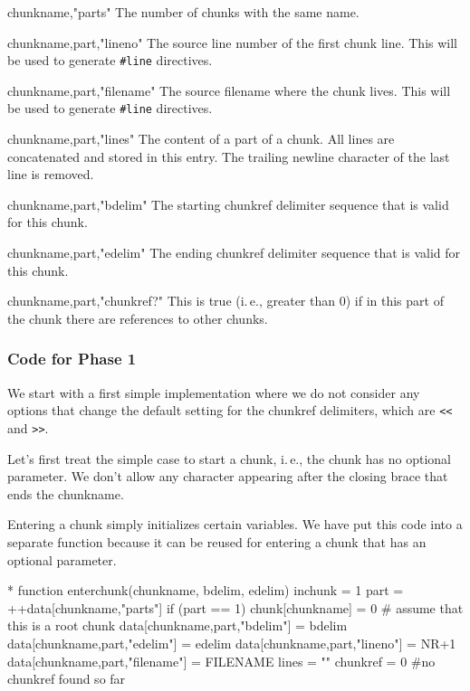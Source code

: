 \documentclass[a4paper]{article} %
\newcommand{\ie}{i.\,e.}
\newenvironment{ttdescription}
  {\list{}{\labelwidth0pt \itemindent-\leftmargin
      \def\makelabel##1{\hspace\labelsep
        \normalfont\ttfamily ##1:}}}
  {\endlist}
\begin{document}
\begin{ttdescription}
\item[chunkname,"parts"] The number of chunks with the same name.

\item[chunkname,part,"lineno"] The source line number of the first
  chunk line. This will be used to generate \texttt{\#line}
  directives.

\item[chunkname,part,"filename"] The source filename where the chunk
  lives. This will be used to generate \texttt{\#line} directives.

\item[chunkname,part,"lines"] The content of a part of a chunk. All
  lines are concatenated and stored in this entry. The trailing
  newline character of the last line is removed.

\item[chunkname,part,"bdelim"] The starting chunkref delimiter
  sequence that is valid for this chunk.

\item[chunkname,part,"edelim"] The ending chunkref delimiter sequence
  that is valid for this chunk.

\item[chunkname,part,"chunkref?"] This is true (\ie, greater than 0)
  if in this part of the chunk there are references to other chunks.
\end{ttdescription}

\subsubsection{Code for Phase 1}

We start with a first simple implementation where we do not consider
any options that change the default setting for the chunkref
delimiters, which are \texttt{<<} and \texttt{>>}.

Let's first treat the simple case to start a chunk, \ie, the chunk has
no optional parameter. We don't allow any character appearing after
the closing brace that ends the chunkname.

Entering a chunk simply initializes certain variables. We have put
this code into a separate function because it can be reused for
entering a chunk that has an optional parameter.
\begin{chunk}{*}
function enterchunk(chunkname, bdelim, edelim) {
  inchunk = 1
  part = ++data[chunkname,"parts"]
  if (part == 1) {chunk[chunkname] = 0} # assume that this is a root chunk
  data[chunkname,part,"bdelim"] = bdelim
  data[chunkname,part,"edelim"] = edelim
  data[chunkname,part,"lineno"] = NR+1
  data[chunkname,part,"filename"] = FILENAME
  lines = ""
  chunkref = 0 #no chunkref found so far
}
\end{chunk}
\end{document}
